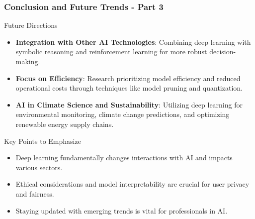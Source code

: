 \documentclass[aspectratio=169]{beamer}
\begin{document}
\begin{frame}[fragile]
    \frametitle{Conclusion and Future Trends - Part 3}
    \begin{block}{Future Directions}
        \begin{itemize}
            \item \textbf{Integration with Other AI Technologies}: Combining deep learning with symbolic reasoning and reinforcement learning for more robust decision-making.
            \item \textbf{Focus on Efficiency}: Research prioritizing model efficiency and reduced operational costs through techniques like model pruning and quantization.
            \item \textbf{AI in Climate Science and Sustainability}: Utilizing deep learning for environmental monitoring, climate change predictions, and optimizing renewable energy supply chains.
        \end{itemize}
    \end{block}
    
    \begin{block}{Key Points to Emphasize}
        \begin{itemize}
            \item Deep learning fundamentally changes interactions with AI and impacts various sectors.
            \item Ethical considerations and model interpretability are crucial for user privacy and fairness.
            \item Staying updated with emerging trends is vital for professionals in AI.
        \end{itemize}
    \end{block}
\end{frame}
\end{document}
